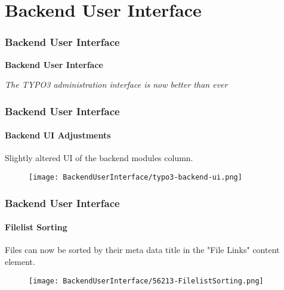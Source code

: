 %

\section{Backend User Interface}
\begin{frame}[fragile]
	\frametitle{Backend User Interface}

	\begin{center}\huge{\color{typo3darkgrey}\textbf{Backend User Interface}}\end{center}
	\begin{center}\large{\textit{The TYPO3 administration interface is now better than ever}}\end{center}

\end{frame}


\begin{frame}[fragile]
	\frametitle{Backend User Interface}
	\framesubtitle{Backend UI Adjustments}

	Slightly altered UI of the backend modules column.

	\begin{figure}
		\texttt{[image: BackendUserInterface/typo3-backend-ui.png]}
	\end{figure}

\end{frame}


\begin{frame}[fragile]
	\frametitle{Backend User Interface}
	\framesubtitle{Filelist Sorting}

	Files can now be sorted by their meta data title in the "File Links" content element.

	\begin{figure}
		\texttt{[image: BackendUserInterface/56213-FilelistSorting.png]}
	\end{figure}

\end{frame}

